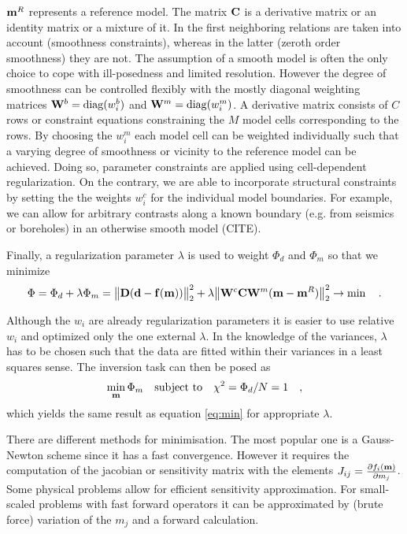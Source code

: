 $\mathbf{m}^R$ represents a reference model.
The matrix $\mathbf{C}$ is a derivative matrix or an identity matrix or a mixture of it.
In the first neighboring relations are taken into account (smoothness constraints), whereas in the latter (zeroth order smoothness) they are not.
The assumption of a smooth model is often the only choice to cope with ill-posedness and limited resolution.
However the degree of smoothness can be controlled flexibly with the mostly diagonal weighting matrices $\mathbf{W}^b=\operatorname{diag}(w^b_i)$ and $\mathbf{W}^m=\operatorname{diag}(w^m_i)$.
A derivative matrix consists of $C$ rows or constraint equations constraining the $M$ model cells corresponding to the rows.
By choosing the $w^m_i$  each model cell can be weighted individually such that a varying degree of smoothness or vicinity to the reference model can be achieved. 
Doing so, parameter constraints are applied using cell-dependent regularization.
On the contrary, we are able to incorporate structural constraints by setting the the weights $w^c_i$ for the individual model boundaries. 
For example, we can allow for arbitrary contrasts along a known boundary (e.g. from seismics or boreholes) in an otherwise smooth model (CITE).

Finally, a regularization parameter $\lambda$ is used to weight $\Phi_d$ and $\Phi_m$ so that we minimize
\begin{equation}\label{eq:min}
\Phi = \Phi_d + \lambda\Phi_m = \big\Vert \mathbf{D}(\mathbf{d} - \mathbf{f}(\mathbf{m})) \big\Vert^2_2 
+ \lambda \big\Vert\mathbf{W}^c \mathbf{C} \mathbf{W}^m (\mathbf{m}-\mathbf{m}^R)\big\Vert^2_2 \rightarrow \min\quad.
\end{equation}

Although the $w_i$ are already regularization parameters it is easier to use relative $w_i$ and optimized only the one external $\lambda$.
In the knowledge of the variances, $\lambda$ has to be chosen such that the data are fitted within their variances in a least squares sense. The inversion task can then be posed as
\[ \min\limits_{\mathbf{m}} \Phi_m \quad\mbox{subject to}\quad \chi^2=\Phi_d/N=1 \quad, \]
which yields the same result as equation \ref{eq:min} for appropriate $\lambda$.

There are different methods for minimisation.
The most popular one is a Gauss-Newton scheme since it has a fast convergence.
However it requires the computation of the jacobian or sensitivity matrix with the elements $J_{ij}=\frac{\partial f_i(\mathbf{m})}{\partial m_j}$.
Some physical problems allow for efficient sensitivity approximation.
For small-scaled problems with fast forward operators it can be approximated by (brute force) variation of the $m_j$ and a forward calculation.

